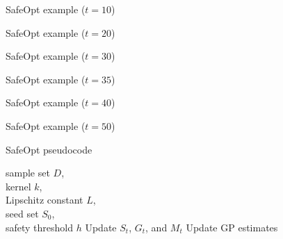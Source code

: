 \documentclass[xetex,10pt,mathserif]{beamer}
\newlength\figureheight
\newlength\figurewidth
\newcommand{\cst}{{\color{cyan!70!black}$S_t$}\xspace}
\newcommand{\cgt}{{\color{lime!70!black}$G_t$}\xspace}
\newcommand{\ccgt}{{\color{lime!70!black}G_t}\xspace}
\newcommand{\cmt}{{\color{orange!70!black}$M_t$}\xspace}
\newcommand{\ccmt}{{\color{orange!70!black}M_t}\xspace}
\begin{document}
\begin{frame}{SafeOpt example ($t = 10$)}
  \centering
  \setlength\figurewidth{5in}
  \setlength\figureheight{3.5in}
  
\end{frame}

\begin{frame}{SafeOpt example ($t = 20$)}
  \centering
  \setlength\figurewidth{5in}
  \setlength\figureheight{3.5in}
  
\end{frame}

\begin{frame}{SafeOpt example ($t = 30$)}
  \centering
  \setlength\figurewidth{5in}
  \setlength\figureheight{3.5in}
  
\end{frame}

\begin{frame}{SafeOpt example ($t = 35$)}
  \centering
  \setlength\figurewidth{5in}
  \setlength\figureheight{3.5in}
  
\end{frame}

\begin{frame}{SafeOpt example ($t = 40$)}
  \centering
  \setlength\figurewidth{5in}
  \setlength\figureheight{3.5in}
  
\end{frame}

\begin{frame}{SafeOpt example ($t = 50$)}
  \centering
  \setlength\figurewidth{5in}
  \setlength\figureheight{3.5in}
  
\end{frame}


\begin{frame}{SafeOpt pseudocode}
\begin{algorithmic}
  \REQUIRE sample set $D$,\\
           \hspace{2.1em}kernel $k$,\\
           \hspace{2.1em}Lipschitz constant $L$,\\
           \hspace{2.1em}seed set $S_0$,\\
           \hspace{2.1em}safety threshold $h$
  \STATE
    \STATE Update \cst, \cgt, and \cmt
    \LET{$x_t$}{$\argmax_{x \in \ccgt \cup \ccmt}(u_t(x) - \ell_t(x))$}
    \STATE Update GP estimates
  \ENDFOR
\end{algorithmic}
\end{frame}
\end{document}
